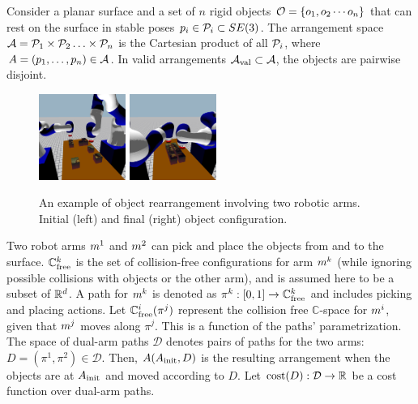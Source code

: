 Consider a planar surface and a set of $n$ rigid objects $ \mathcal{O}=\{ o_1, o_2 \cdots o_n\}$  that can rest on the surface in stable poses $p_i \in \mathcal{P}_i \subset SE(3)$. The arrangement space $ \mathcal{A} = \mathcal{P}_1 \times \mathcal{P}_2 \ldots \times \mathcal{P}_n $ is the Cartesian product of all $\mathcal{P}_i$, where $ A = (p_1, \ldots, p_n) \in \mathcal{A} $. In valid arrangements $ \mathcal{A}_{\rm val} \subset \mathcal{A}$, the objects are pairwise disjoint.

\begin{figure}
    \vspace{-.3in}
	\centering
	\includegraphics[width=1.115in,trim={10cm 3cm 8cm 12cm},clip]{figures/rearrangement_start}
	\includegraphics[width=1.115in,trim={10cm 3cm 8cm 12cm},clip]{figures/rearrangement_end}
    \vspace{-.15in}
	\caption{An example of object rearrangement involving two robotic arms. Initial (left) and final (right) object configuration.}
	\label{fig:rearrangement}
    \vspace{-.35in}
\end{figure}
Two robot arms $m^1$ and $m^2$ can 
pick and place the objects from and to the surface.
$\mathbb{C}_{{\rm free}}^k$ is the set of collision-free configurations for arm $m^k$ (while ignoring possible collisions with  objects or the other arm), and is assumed here to be a subset of $\mathbb{R}^d $.
A path for $m^k$ is denoted as $ \pi^k : [0,1] \rightarrow \mathbb{C}_{{\rm free}}^k$ and includes picking and placing actions.  Let $ \mathbb{C}_{{\rm free}}^i(\pi^j) $ represent the collision free $\mathbb{C}$-space for $m^i$, given that $m^j$ moves along $\pi^j $. This is a function of the paths' parametrization. The space of dual-arm paths $\mathcal{D}$ denotes pairs of paths for the two arms: $D = (\pi^1,\pi^2) \in \mathcal{D}$. Then, $A(A_{\rm init}, D)$ is the resulting arrangement when the objects are at $A_{\rm init}$ and moved according to $D$.   Let $ \textup{cost}(D) : \mathcal{D} \rightarrow \mathbb{R} $ be a cost function over dual-arm paths. 

